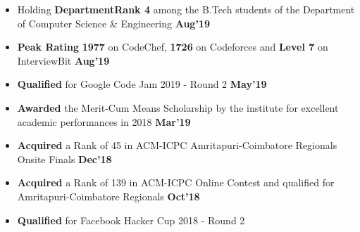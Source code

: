 \documentclass[10pt]{article}
\begin{document}
\vspace{-2.0ex}
\spacedhrule{0.1ex}{1.0ex}
\begin{itemize}[leftmargin=*]
\item Holding \textbf{DepartmentRank 4} among the B.Tech students of the Department of Computer Science \& Engineering
{\hfill}\textbf{Aug'19}\\[-2em]
\item \textbf{Peak Rating} \textbf{1977} on CodeChef, \textbf{1726} on Codeforces and \textbf{Level 7} on InterviewBit
\href{https://github.com/shmundhra/Credentials/tree/master/Competitive\%20Programming/Online\%20Judges\%20Profiles} {\hspace{0.5ex}\footnotesize\faMousePointer}
{\hfill}\textbf{Aug'19}\\[-2em]
\item \textbf{Qualified} for Google Code Jam 2019 - Round 2
\href{https://github.com/shmundhra/Credentials/tree/master/Competitive\%20Programming/Google\%20CodeJam} {\hspace{0.5ex}\footnotesize\faMousePointer}
{\hfill}\textbf{May'19}\\[-2em]
\item \textbf{Awarded} the Merit-Cum Means Scholarship by the institute for excellent academic performances in 2018
\href{https://github.com/shmundhra/Credentials/tree/master/Scholarships} {\hspace{0.5ex}\footnotesize\faMousePointer}
{\hfill}\textbf{Mar'19}\\[-2em]
\item \textbf{Acquired} a Rank of 45 in ACM-ICPC Amritapuri-Coimbatore Regionals Onsite Finals
\href{https://github.com/shmundhra/Credentials/tree/master/Competitive\%20Programming/ACM\%20ICPC\%202018} {\hspace{0.5ex}\footnotesize\faMousePointer}
{\hfill}\textbf{Dec'18}\\[-2em]
\item \textbf{Acquired} a Rank of 139 in ACM-ICPC Online Contest and qualified for Amritapuri-Coimbatore Regionals
\href{https://github.com/shmundhra/Credentials/tree/master/Competitive\%20Programming/ACM\%20ICPC\%202018} {\hspace{0.5ex}\footnotesize\faMousePointer}
{\hfill}\textbf{Oct'18}\\[-2em]
\item \textbf{Qualified} for Facebook Hacker Cup 2018 - Round 2 
\href{https://github.com/shmundhra/Credentials/tree/master/Competitive\%20Programming/Facebook\%20Hacker\%20Cup} {\hspace{0.5ex}\footnotesize\faMousePointer}

\end{itemize}
\end{document}
